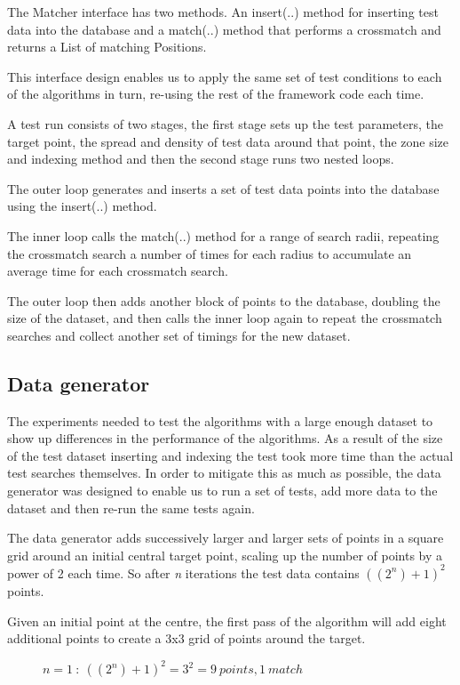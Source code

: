 \documentclass{article}
\newcommand{\centre} {centre\xspace}
\newcommand{\crossmatch} {crossmatch\xspace}
\newcommand{\dataset} {dataset\xspace}
\newcommand{\javaname}[1] {{\ttfamily\color{codeblue} #1}}
\newcommand{\javaplural}[1] {\javaname{#1}s}
\begin{document}
The \javaname{Matcher} interface has two methods.
An \javaname{insert(..)} method for inserting test data into the database and a \javaname{match(..)} method that performs a \crossmatch and returns a \javaname{List} of matching \javaplural{Position}.

This interface design enables us to apply the same set of test conditions to each of the algorithms in turn, re-using the rest of the framework code each time.

A test run consists of two stages, the first stage sets up the test parameters, the target point, the spread and density of test data around that point, the zone size and indexing method and then the second stage runs two nested loops.

The outer loop generates and inserts a set of test data points into the database using the \javaname{insert(..)} method.

The inner loop calls the \javaname{match(..)} method for a range of search radii, repeating the \crossmatch search a number of times for each radius to accumulate an average time for each \crossmatch search.

The outer loop then adds another block of points to the database, doubling the size of the \dataset, and then calls the inner loop again to repeat the \crossmatch searches and collect another set of timings for the new \dataset.

\subsection{Data generator}
\label{test-data-generator}

The experiments needed to test the algorithms with a large enough \dataset to show up differences in the performance of the algorithms.
As a result of the size of the test \dataset inserting and indexing the test took more time than the actual test searches themselves.
In order to mitigate this as much as possible, the data generator was designed to enable us to run a set of tests, add more data to the \dataset and then re-run the same tests again.

The data generator adds successively larger and larger sets of points in a square grid around an initial central target point, scaling up the number of points by a power of 2 each time.
So after \textit{n} iterations the test data contains \(((2^n)+1)^2\) points.

Given an initial point at the \centre, the first pass of the algorithm will add eight additional points to create a 3x3 grid of points around the target. 
\begin{figure}[hbt!]
\centering

\caption{$n=1 \ :\ ((2^n)+1)^2 = 3^2 = 9 \ points, 1 \ match$}
\label{fig:data-count-01}
\end{figure}
\end{document}
